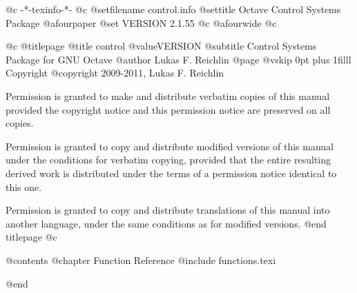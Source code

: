    @c -*-texinfo-*-
@c %
@setfilename control.info
@settitle Octave Control Systems Package
@afourpaper
@set VERSION 2.1.55
@c @afourwide
@c %

@c %
@titlepage
@title control @value{VERSION}
@subtitle Control Systems Package for GNU Octave
@author Lukas F. Reichlin
@page
@vskip 0pt plus 1filll
Copyright @copyright{} 2009-2011, Lukas F. Reichlin

Permission is granted to make and distribute verbatim copies of
this manual provided the copyright notice and this permission notice
are preserved on all copies.

Permission is granted to copy and distribute modified versions of this
manual under the conditions for verbatim copying, provided that the entire
resulting derived work is distributed under the terms of a permission
notice identical to this one.

Permission is granted to copy and distribute translations of this manual
into another language, under the same conditions as for modified versions.
@end titlepage
@c %

@contents
@chapter Function Reference
@include functions.texi

@end
